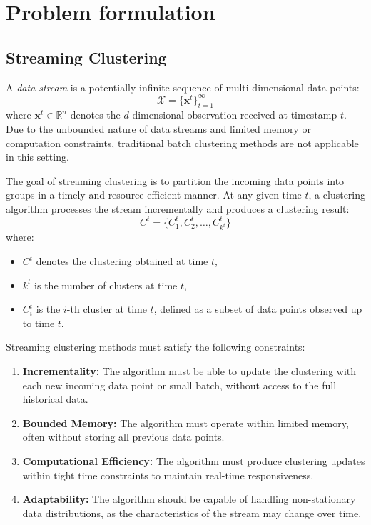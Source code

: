 \chapter{Problem formulation}\label{ch:problem_formulation}

\section{Streaming Clustering}\label{sec:prob_streaming_clustering}
A \textit{data stream} is a potentially infinite sequence of multi-dimensional
data points:
\begin{equation}
    \mathcal{X} = \{\mathbf{x}^t\}_{t=1}^{\infty}
\end{equation}
where $\mathbf{x}^t \in \mathbb{R}^n$ denotes the $d$-dimensional observation received at timestamp $t$.
Due to the unbounded nature of data streams and limited memory or computation
constraints, traditional batch clustering methods are not applicable in this
setting.

The goal of streaming clustering is to partition the incoming data points into
groups in a timely and resource-efficient manner. At any given time $t$, a
clustering algorithm processes the stream incrementally and produces a
clustering result:
\begin{equation}
    C^t = \{C_1^t, C_2^t, \dots, C_{k^t}^t\}
\end{equation}
where:
\begin{itemize}
    \item $C^t$ denotes the clustering obtained at time $t$,
    \item $k^t$ is the number of clusters at time $t$,
    \item $C_i^t$ is the $i$-th cluster at time $t$, defined as a subset of data
          points observed up to time $t$.
\end{itemize}

Streaming clustering methods must satisfy the following constraints:

\begin{enumerate}
    \item \textbf{Incrementality:} The algorithm must be able to update the clustering
          with each new incoming data point or small batch, without access to the full
          historical data.

    \item \textbf{Bounded Memory:} The algorithm must operate within limited memory,
          often without storing all previous data points.

    \item \textbf{Computational Efficiency:} The algorithm must produce clustering
          updates within tight time constraints to maintain real-time responsiveness.

    \item \textbf{Adaptability:} The algorithm should be capable of handling non-stationary
          data distributions, as the characteristics of the stream may change over time.
\end{enumerate}

